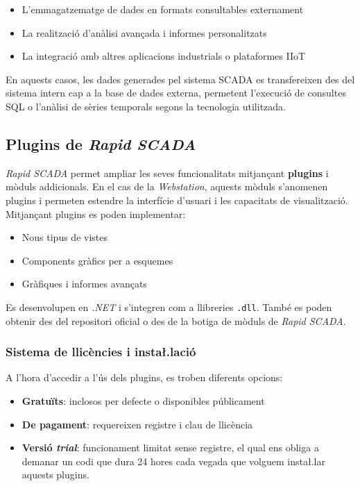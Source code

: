 \documentclass[a4paper,11pt,DIV=13,headings=normal,abstract=true,twoside=semi]{article}
\newcommand{\acro}[1]{\textsc{#1}}
\begin{document}
\begin{itemize}
    \item L'emmagatzematge de dades en formats consultables externament
    \item La realització d'anàlisi avançada i informes personalitzats
    \item La integració amb altres aplicacions industrials o plataformes IIoT
\end{itemize}

En aquests casos, les dades generades pel sistema \acro{SCADA} es transfereixen des del sistema intern cap a la base de dades externa, permetent l'execució de consultes SQL o l'anàlisi de sèries temporals segons la tecnologia utilitzada.

\subsection{Plugins de \emph{Rapid SCADA}}


\emph{Rapid SCADA} permet ampliar les seves funcionalitats mitjançant \textbf{plugins} i mòduls addicionals. En el cas de la \emph{Webstation}, aquests mòduls s'anomenen plugins i permeten estendre la interfície d'usuari i les capacitats de visualització. Mitjançant plugins es poden implementar:
\begin{itemize}
    \item Nous tipus de vistes
    \item Components gràfics per a esquemes
    \item Gràfiques i informes avançats
\end{itemize}

Es desenvolupen en \emph{.NET} \cite{rapidscada_dev_basics} i s'integren com a llibreries \texttt{.dll}. També es poden obtenir des del repositori oficial o des de la botiga de mòduls de \emph{Rapid SCADA}.

\subsubsection{Sistema de llicències i insta\l.lació}

A l'hora d'accedir a l'ús dels plugins, es troben diferents opcions:
\begin{itemize}
    \item \textbf{Gratuïts}: inclosos per defecte o disponibles públicament
    \item \textbf{De pagament}: requereixen registre i clau de llicència
    \item \textbf{Versió \emph{trial}}: funcionament limitat sense registre, el qual ens obliga a demanar un codi que dura 24 hores cada vegada que volguem insta\l.lar aquests plugins. 
\end{itemize}
\end{document}
